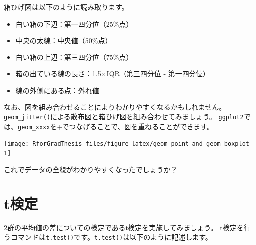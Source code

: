\documentclass[]{book}
\newenvironment{Shaded}{\begin{snugshade}}{\end{snugshade}}
\newcommand{\KeywordTok}[1]{\textcolor[rgb]{0.13,0.29,0.53}{\textbf{#1}}}
\newcommand{\DataTypeTok}[1]{\textcolor[rgb]{0.13,0.29,0.53}{#1}}
\newcommand{\DecValTok}[1]{\textcolor[rgb]{0.00,0.00,0.81}{#1}}
\newcommand{\FloatTok}[1]{\textcolor[rgb]{0.00,0.00,0.81}{#1}}
\newcommand{\StringTok}[1]{\textcolor[rgb]{0.31,0.60,0.02}{#1}}
\newcommand{\CommentTok}[1]{\textcolor[rgb]{0.56,0.35,0.01}{\textit{#1}}}
\newcommand{\OtherTok}[1]{\textcolor[rgb]{0.56,0.35,0.01}{#1}}
\newcommand{\OperatorTok}[1]{\textcolor[rgb]{0.81,0.36,0.00}{\textbf{#1}}}
\newcommand{\NormalTok}[1]{#1}
\providecommand{\tightlist}{%
  \setlength{\itemsep}{0pt}\setlength{\parskip}{0pt}}
\begin{document}
箱ひげ図は以下のように読み取ります。

\begin{itemize}
\tightlist
\item
  白い箱の下辺：第一四分位（25\%点）
\item
  中央の太線：中央値（50\%点）
\item
  白い箱の上辺：第三四分位（75\%点）
\item
  箱の出ている線の長さ：1.5×IQR（第三四分位 - 第一四分位）
\item
  線の外側にある点：外れ値
\end{itemize}

なお、図を組み合わせることによりわかりやすくなるかもしれません。
\texttt{geom\_jitter()}による散布図と箱ひげ図を組み合わせてみましょう。
\texttt{ggplot2}では、\texttt{geom\_xxxx}を+でつなげることで、図を重ねることができます。

\begin{Shaded}
\end{Shaded}

\begin{center}\texttt{[image: RforGradThesis\_files/figure-latex/geom\_point and geom\_boxplot-1]} \end{center}

これでデータの全貌がわかりやすくなったでしょうか？

\chapter{t検定}\label{Ttest}

2群の平均値の差についての検定であるt検定を実施してみましょう。
t検定を行うコマンドは\texttt{t.test()}です。\texttt{t.test()}は以下のように記述します。
\end{document}
